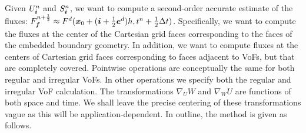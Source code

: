 Given $U^n_{\boldsymbol{i}}$ and $S^n_{\boldsymbol{i}}$, we want to compute a second-order accurate
estimate of the fluxes: $F^{n+\frac{1}{2}}_{\boldsymbol{f}} \approx
F^d({\boldsymbol{x}}_0 +({\boldsymbol{i}}+\frac{1}{2} {\boldsymbol{e}}^d)h,t^n + \frac{1}{2} \Delta t)$.  
Specifically, we want to compute the fluxes at the center
of the Cartesian grid faces corresponding to the faces of the embedded
boundary geometry. In addition, we want to compute fluxes at the
centers of Cartesian grid faces corresponding to faces adjacent to
VoFs, but that are completely covered.
Pointwise operations are 
conceptually the same for both regular and irregular VoFs. In
other operations we specify both the regular and irregular 
VoF calculation. The transformations $\nabla_U W $ and
$\nabla_W U$ are functions of both space and time.  We shall
leave the precise centering of these transformations vague
as this will be application-dependent.
In outline, the method is given as follows.

